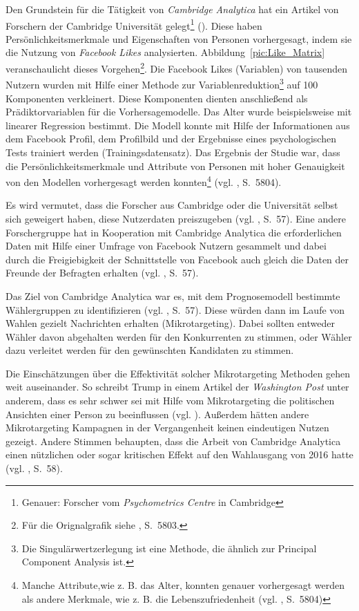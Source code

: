 Den Grundstein für die Tätigkeit von \emph{Cambridge Analytica} hat ein Artikel
von Forschern der Cambridge Universität gelegt\footnote{
Genauer: Forscher vom \emph{Psychometrics Centre} in Cambridge
} (\cite{Kosinski}). Diese haben Persönlichkeitsmerkmale und Eigenschaften von
Personen vorhergesagt, indem sie die Nutzung von \emph{Facebook Likes} analysierten.
Abbildung~\ref{pic:Like_Matrix} veranschaulicht dieses Vorgehen\footnote{
Für die Orignalgrafik siehe \cite{Kosinski}, S.~5803.
}. Die Facebook Likes (Variablen) von tausenden Nutzern wurden mit Hilfe einer Methode zur
Variablenreduktion\footnote{
Die Singulärwertzerlegung ist eine Methode, die ähnlich zur Principal Component Analysis ist.
} auf 100 Komponenten verkleinert. Diese Komponenten dienten anschließend als Prädiktorvariablen
für die Vorhersagemodelle. Das Alter wurde beispielsweise mit linearer Regression bestimmt.
Die Modell konnte mit Hilfe der Informationen aus dem Facebook Profil, dem
Profilbild und der Ergebnisse eines psychologischen Tests trainiert werden (Trainingsdatensatz).
Das Ergebnis der Studie war, dass die Persönlichkeitsmerkmale und Attribute von Personen mit hoher
Genauigkeit von den Modellen vorhergesagt werden konnten\footnote{
Manche Attribute,wie z. B. das Alter, konnten genauer vorhergesagt werden als andere Merkmale, wie z. B. die Lebenszufriedenheit (vgl. \cite{Kosinski}, S.~5804)
} (vgl. \cite{Kosinski}, S.~5804).

Es wird vermutet, dass die Forscher aus Cambridge oder die Universität selbst sich geweigert haben, diese Nutzerdaten
preiszugeben (vgl. \cite{Isaak}, S.~57). Eine andere Forschergruppe hat in Kooperation mit Cambridge Analytica die
erforderlichen Daten mit Hilfe einer Umfrage von Facebook Nutzern gesammelt und dabei durch die Freigiebigkeit der Schnittstelle von
Facebook auch gleich die Daten der Freunde der Befragten erhalten (vgl. \cite{Isaak}, S.~57).

Das Ziel von Cambridge Analytica war es, mit dem Prognosemodell bestimmte Wählergruppen zu identifizieren (vgl. \cite{Isaak}, S.~57).
Diese würden dann im Laufe von Wahlen gezielt Nachrichten erhalten (Mikrotargeting). Dabei sollten entweder Wähler davon abgehalten
werden für den Konkurrenten zu stimmen, oder Wähler dazu verleitet werden für den gewünschten Kandidaten zu stimmen.

Die Einschätzungen über die Effektivität solcher Mikrotargeting Methoden gehen weit auseinander. So schreibt Trump in einem
Artikel der \emph{Washington Post} unter anderem, dass es sehr schwer sei mit Hilfe vom Mikrotargeting die politischen Ansichten
einer Person zu beeinflussen (vgl. \cite{Trump}). Außerdem hätten andere Mikrotargeting Kampagnen in der Vergangenheit keinen
eindeutigen Nutzen gezeigt. Andere Stimmen behaupten, dass die Arbeit von Cambridge Analytica einen nützlichen oder sogar
kritischen Effekt auf den Wahlausgang von 2016 hatte (vgl. \cite{Isaak}, S.~58).

